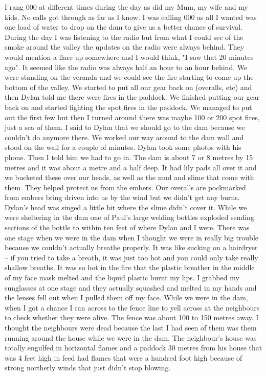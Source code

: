 \documentclass[a4paper]{article}
\begin{document}
        I rang 000 at different times during the day as did my Mum, my wife and my kids. No calls got through as far as I know. I was calling 000 as all I wanted was one load of water to drop on the dam to give us a better chance of survival.
        During the day I was listening to the radio but from what I could see of the smoke around the valley the updates on the radio were always behind. They would mention a flare up somewhere and I would think, "I saw that 20 minutes ago". It seemed like the radio was always half an hour to an hour behind.
        We were standing on the veranda and we could see the fire starting to come up the bottom of the valley. We started to put all our gear back on (overalls, etc) and then Dylan told me there were fires in the paddock. We finished putting our gear back on and started fighting the spot fires in the paddock. We managed to put out the first few but then I turned around there was maybe 100 or 200 spot fires, just a sea of them. I said to Dylan that we should go to the dam because we couldn't do anymore there. We worked our way around to the dam wall and stood on the wall for a couple of minutes. Dylan took some photos with his phone. Then I told him we had to go in.
        The dam is about 7 or 8 metres by 15 metres and it was about a metre and a half deep. It had lily pads all over it and we bucketed these over our heads, as well as the mud and slime that come with them. They helped protect us from the embers. Our overalls are pockmarked from embers bring driven into us by the wind but we didn't get any burns. Dylan's head was singed a little bit where the slime didn't cover it.
        While we were sheltering in the dam one of Paul's large welding bottles exploded sending sections of the bottle to within ten feet of where Dylan and I were.
        There was one stage when we were in the dam when I thought we were in really big trouble because we couldn't actually breathe properly. It was like sucking on a hairdryer – if you tried to take a breath, it was just too hot and you could only take really shallow breaths.
        It was so hot in the fire that the plastic breather in the middle of my face mask melted and the liquid plastic burnt my lips. I grabbed my sunglasses at one stage and they actually squashed and melted in my hands and the lenses fell out when I pulled them off my face.
        While we were in the dam, when I got a chance I ran across to the fence line to yell across at the neighbours to check whether they were alive. The fence was about 100 to 150 metres away. I thought the neighbours were dead because the last I had seen of them was them running around the house while we were in the dam. The neighbour's house was totally engulfed in horizontal flames and a paddock 30 metres from his house that was 4 feet high in feed had flames that were a hundred foot high because of strong northerly winds that just didn't stop blowing.
\end{document}
